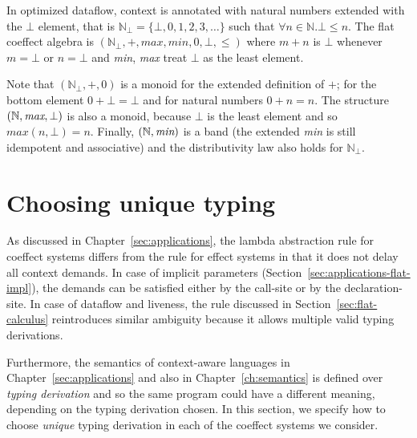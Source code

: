 \begin{example}
In optimized dataflow, context is annotated with natural numbers extended with the $\bot$ element,
that is $\mathbb{N}_{\bot} = \{\bot, 0, 1, 2, 3, \ldots \}$ such that $\forall n \in \mathbb{N}. \bot \leq n$.
The flat coeffect algebra is $(\mathbb{N}_{\bot}, +, \mathit{max}, \mathit{min}, 0, \bot, \leq)$
where $m + n$ is $\bot$ whenever $m=\bot$ or $n=\bot$ and \emph{min}, \emph{max} treat $\bot$ as the
least element.
\end{example}

\noindent
Note that $(\mathbb{N}_{\bot}, +, 0)$ is a monoid for the extended definition of $+$; for the
bottom element $0 + \bot = \bot$ and for natural numbers $0 + n = n$. The structure
$(\mathbb{N}, \emph{max}, \bot)$ is also a monoid, because $\bot$ is the least element and so
$\mathit{max}(n, \bot) = n$. Finally,  $(\mathbb{N}, \emph{min})$ is a band (the extended
\emph{min} is still idempotent and associative) and the distributivity law also holds
for $\mathbb{N}_{\bot}$.


%
%

\section{Choosing unique typing}
\label{sec:flat-unique}

As discussed in Chapter~\ref{sec:applications}, the lambda abstraction rule for coeffect systems
differs from the rule for effect systems in that it does not delay all context demands.
In case of implicit parameters (Section~\ref{sec:applications-flat-impl}), the demands
can be satisfied either by the call-site or by the declaration-site. In case of dataflow and
liveness, the rule discussed in Section~\ref{sec:flat-calculus} reintroduces similar ambiguity
because it allows multiple valid typing derivations.

Furthermore, the semantics of context-aware languages in Chapter~\ref{sec:applications} and
also in Chapter~\ref{ch:semantics} is defined over \emph{typing derivation} and so the same program
could have a different meaning, depending on the typing derivation chosen. In this section, we
specify how to choose \emph{unique} typing derivation in each of the coeffect systems we consider.

